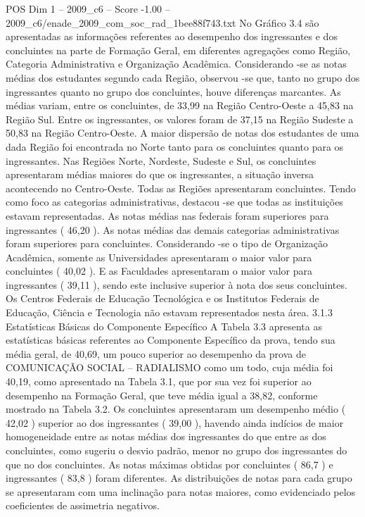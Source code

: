 \begin{textsample}{POS Dim 1 – 2009\_c6 – Score -1.00 – 2009\_c6/enade\_2009\_com\_soc\_rad\_1bee88f743.txt}
No Gráfico 3.4 são apresentadas as informações referentes ao desempenho dos ingressantes e dos concluintes na parte de Formação Geral, em diferentes agregações como Região, Categoria Administrativa e Organização Acadêmica.
Considerando -se as notas médias dos estudantes segundo cada Região, observou -se que, tanto no grupo dos ingressantes quanto no grupo dos concluintes, houve diferenças marcantes.
As médias variam, entre os concluintes, de 33,99 na Região Centro-Oeste a 45,83 na Região Sul.
Entre os ingressantes, os valores foram de 37,15 na Região Sudeste a 50,83 na Região Centro-Oeste.
A maior dispersão de notas dos estudantes de uma dada Região foi encontrada no Norte tanto para os concluintes quanto para os ingressantes.
Nas Regiões Norte, Nordeste, Sudeste e Sul, os concluintes apresentaram médias maiores do que os ingressantes, a situação inversa acontecendo no Centro-Oeste.
Todas as Regiões apresentaram concluintes.
Tendo como foco as categorias administrativas, destacou -se que todas as instituições estavam representadas.
As notas médias nas federais foram superiores para ingressantes ( 46,20 ).
As notas médias das demais categorias administrativas foram superiores para concluintes.
Considerando -se o tipo de Organização Acadêmica, somente as Universidades apresentaram o maior valor para concluintes ( 40,02 ).
E as Faculdades apresentaram o maior valor para ingressantes ( 39,11 ), sendo este inclusive superior à nota dos seus concluintes.
Os Centros Federais de Educação Tecnológica e os Institutos Federais de Educação, Ciência e Tecnologia não estavam representados nesta área. 3.1.3 Estatísticas Básicas do Componente Específico A Tabela 3.3 apresenta as estatísticas básicas referentes ao Componente Específico da prova, tendo sua média geral, de 40,69, um pouco superior ao desempenho da prova de COMUNICAÇÃO SOCIAL – RADIALISMO como um todo, cuja média foi 40,19, como apresentado na Tabela 3.1, que por sua vez foi superior ao desempenho na Formação Geral, que teve média igual a 38,82, conforme mostrado na Tabela 3.2.
Os concluintes apresentaram um desempenho médio ( 42,02 ) superior ao dos ingressantes ( 39,00 ), havendo ainda indícios de maior homogeneidade entre as notas médias dos ingressantes do que entre as dos concluintes, como sugeriu o desvio padrão, menor no grupo dos ingressantes do que no dos concluintes.
As notas máximas obtidas por concluintes ( 86,7 ) e ingressantes ( 83,8 ) foram diferentes.
As distribuições de notas para cada grupo se apresentaram com uma inclinação para notas maiores, como evidenciado pelos coeficientes de assimetria negativos.

\end{textsample}
